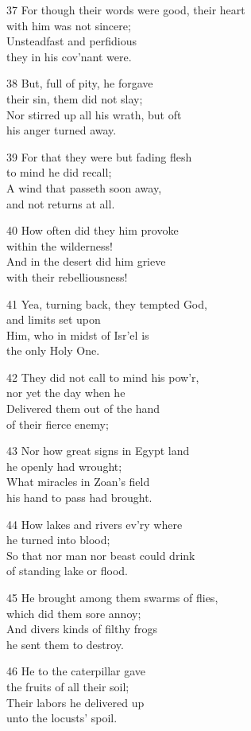 37 For though their words were good, their heart\\
with him was not sincere;\\
Unsteadfast and perfidious\\
they in his cov’nant were.

38 But, full of pity, he forgave\\
their sin, them did not slay;\\
Nor stirred up all his wrath, but oft\\
his anger turned away.

39 For that they were but fading flesh\\
to mind he did recall;\\
A wind that passeth soon away,\\
and not returns at all.

40 How often did they him provoke\\
within the wilderness!\\
And in the desert did him grieve\\
with their rebelliousness!

41 Yea, turning back, they tempted God,\\
and limits set upon\\
Him, who in midst of Isr’el is\\
the only Holy One.

42 They did not call to mind his pow’r,\\
nor yet the day when he\\
Delivered them out of the hand\\
of their fierce enemy;

43 Nor how great signs in Egypt land\\
he openly had wrought;\\
What miracles in Zoan’s field\\
his hand to pass had brought.

44 How lakes and rivers ev’ry where\\
he turned into blood;\\
So that nor man nor beast could drink\\
of standing lake or flood.

45 He brought among them swarms of flies,\\
which did them sore annoy;\\
And divers kinds of filthy frogs\\
he sent them to destroy.

46 He to the caterpillar gave\\
the fruits of all their soil;\\
Their labors he delivered up\\
unto the locusts’ spoil.

